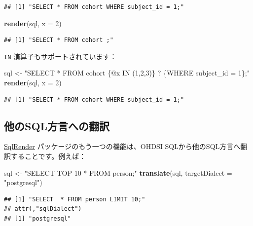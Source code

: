 \documentclass[
  11pt]{book}
\newenvironment{Shaded}{\begin{snugshade}}{\end{snugshade}}
\newcommand{\AttributeTok}[1]{\textcolor[rgb]{0.13,0.29,0.53}{#1}}
\newcommand{\DecValTok}[1]{\textcolor[rgb]{0.00,0.00,0.81}{#1}}
\newcommand{\FunctionTok}[1]{\textcolor[rgb]{0.13,0.29,0.53}{\textbf{#1}}}
\newcommand{\NormalTok}[1]{#1}
\newcommand{\OtherTok}[1]{\textcolor[rgb]{0.56,0.35,0.01}{#1}}
\newcommand{\StringTok}[1]{\textcolor[rgb]{0.31,0.60,0.02}{#1}}
\theoremstyle{definition}
\theoremstyle{definition}
\theoremstyle{definition}
\theoremstyle{definition}
\theoremstyle{remark}
\begin{document}
\begin{verbatim}
## [1] "SELECT * FROM cohort WHERE subject_id = 1;"
\end{verbatim}

\begin{Shaded}
\begin{Highlighting}[]
\FunctionTok{render}\NormalTok{(sql, }\AttributeTok{x =} \DecValTok{2}\NormalTok{)}
\end{Highlighting}
\end{Shaded}

\begin{verbatim}
## [1] "SELECT * FROM cohort ;"
\end{verbatim}

\texttt{IN} 演算子もサポートされています：

\begin{Shaded}
\begin{Highlighting}[]
\NormalTok{sql }\OtherTok{\textless{}{-}} \StringTok{"SELECT * FROM cohort \{@x IN (1,2,3)\} ? \{WHERE subject\_id = 1\};"}
\FunctionTok{render}\NormalTok{(sql, }\AttributeTok{x =} \DecValTok{2}\NormalTok{)}
\end{Highlighting}
\end{Shaded}

\begin{verbatim}
## [1] "SELECT * FROM cohort WHERE subject_id = 1;"
\end{verbatim}

\subsection{他のSQL方言への翻訳}\label{ux4ed6ux306esqlux65b9ux8a00ux3078ux306eux7ffbux8a33}

\href{https://ohdsi.github.io/SqlRender/}{SqlRender} パッケージのもう一つの機能は、OHDSI SQLから他のSQL方言へ翻訳することです。例えば：

\begin{Shaded}
\begin{Highlighting}[]
\NormalTok{sql }\OtherTok{\textless{}{-}} \StringTok{"SELECT TOP 10 * FROM person;"}
\FunctionTok{translate}\NormalTok{(sql, }\AttributeTok{targetDialect =} \StringTok{"postgresql"}\NormalTok{)}
\end{Highlighting}
\end{Shaded}

\begin{verbatim}
## [1] "SELECT  * FROM person LIMIT 10;"
## attr(,"sqlDialect")
## [1] "postgresql"
\end{verbatim}
\end{document}
